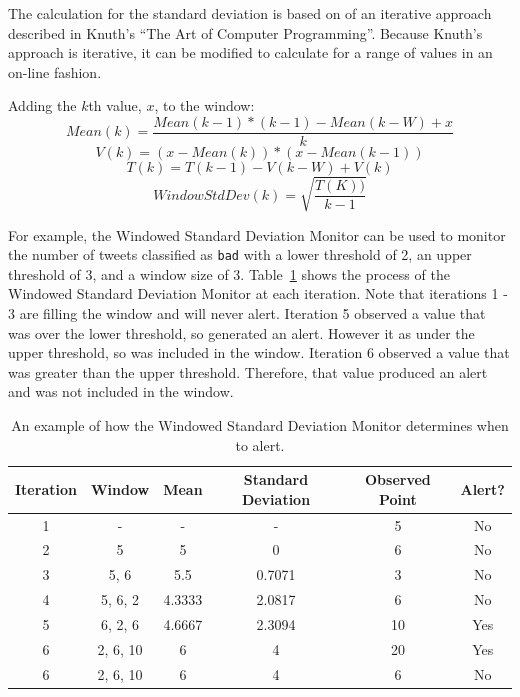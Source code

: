 \documentclass[12pt]{ucthesis}
\begin{document}
The calculation for the standard deviation is based on of an iterative approach described in Knuth's ``The Art of Computer Programming''\cite{Knuth}.
Because Knuth's approach is iterative, it can be modified to calculate for a range of values in an on-line fashion.

Adding the $k$th value, $x$, to the window:
$$
   Mean(k) = \frac{Mean(k - 1) * (k - 1) - Mean(k - W) + x}{k}
$$
$$
   V(k) = (x - Mean(k)) * (x - Mean(k - 1))
$$
$$
   T(k) = T(k - 1) - V(k - W) + V(k)
$$
$$
   WindowStdDev(k) = \sqrt{\frac{T(K))}{k - 1}}
$$

For example, the Windowed Standard Deviation Monitor can be used to monitor the number of tweets classified as \texttt{bad} with a lower threshold of 2, an upper threshold of 3, and a window size of 3.
Table~\ref{table:weeklyWindowEx} shows the process of the Windowed Standard Deviation Monitor at each iteration.
Note that iterations 1 - 3 are filling the window and will never alert.
Iteration 5 observed a value that was over the lower threshold, so generated an alert. However it as under the upper threshold, so was included in the window.
Iteration 6 observed a value that was greater than the upper threshold. Therefore, that value produced an alert and was not included in the window.

\begin{table}[H]
   \begin{center}
      \begin{tabular}{|c|c|c|c|c|c|}
         \hline
            Iteration & Window & Mean & Standard Deviation & Observed Point & Alert?
         \tabularnewline\hline
            1 & - & - & - & 5 & No
         \tabularnewline\hline
            2 & 5 & 5 & 0 & 6 & No
         \tabularnewline\hline
            3 & 5, 6 & 5.5 & 0.7071 & 3 & No
         \tabularnewline\hline
            4 & 5, 6, 2 & 4.3333 & 2.0817 & 6 & No
         \tabularnewline\hline
            5 & 6, 2, 6 & 4.6667 & 2.3094 & 10 & Yes
         \tabularnewline\hline
            6 & 2, 6, 10 & 6 & 4 & 20 & Yes
         \tabularnewline\hline
            6 & 2, 6, 10 & 6 & 4 & 6 & No
         \tabularnewline\hline
      \end{tabular}
   \end{center}
   \caption[Windowed Standard Deviation Monitor Example]{An example of how the Windowed Standard Deviation Monitor determines when to alert.}
   \label{table:weeklyWindowEx}
\end{table}
\end{document}
